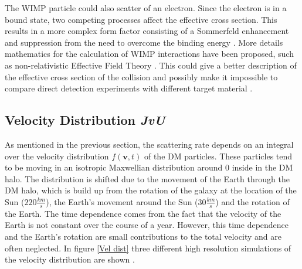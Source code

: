 \documentclass{article}
\begin{document}
The WIMP particle could also scatter of an electron. Since the electron is in a bound state, two competing processes affect the effective cross section. This results in a more complex form factor consisting of a Sommerfeld enhancement \cite{ArkaniHamed:2008qn} and suppression from the need to overcome the binding energy \cite{Essig:2011nj}.
More details mathematics for the calculation of WIMP interactions have been proposed, such as non-relativistic Effective Field Theory \cite{Fitzpatrick:2012ib}. This could give a better description of the effective cross section of the collision and possibly make it impossible to compare direct detection experiments with different target material \cite{Schneck:2015eqa}. 

\subsection{Velocity Distribution \small{\textit{JvU}}} \label{DM_Velocity}

As mentioned in the previous section, the scattering rate depends on an integral over the velocity distribution $f(\textbf{v},t)$ of the DM particles. These particles tend to be moving in an isotropic Maxwellian distribution around 0 inside in the DM halo. The distribution is shifted due to the movement of the Earth through the DM halo, which is build up from the rotation of the galaxy at the location of the Sun ($220\frac{km}{s}$), the Earth's movement around the Sun ($30\frac{km}{s}$) and the rotation of the Earth. The time dependence comes from the fact that the velocity of the Earth is not constant over the course of a year. However, this time dependence and the Earth's rotation are small contributions to the total velocity and are often neglected. In figure \ref{Vel dist} three different high resolution simulations of the velocity distribution are shown \cite{Kuhlen:2009vh}.
\end{document}
